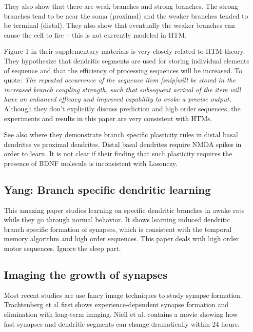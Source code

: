 \documentclass{article} %
\begin{document}
They also show that there are weak branches and strong branches.  The strong
branches tend to be near the soma (proximal) and the weaker branches tended to
be terminal (distal). They also show that eventually the weaker branches can
cause the cell to fire – this is not currently modeled in HTM.

Figure 1 in their supplementary materials is very closely related to HTM
theory. They hypothesize that dendritic segments are used for storing
individual elements of sequence and that the efficiency of processing
sequences will be increased. To quote: \emph{The repeated occurrence of the
sequence item [snip]will be stored in the increased branch coupling strength,
such that subsequent arrival of the item will have an enhanced efficacy and
improved capability to evoke a precise output.} Although they don't explicitly
discuss prediction and high order sequences, the experiments and results in this
paper are very consistent with HTMs.

See also \cite{Gordon2006} where they demonstrate branch specific plasticity
rules in distal basal dendrites vs proximal dendrites.  Distal basal dendrites
require NMDA spikes in order to learn. It is not clear if their finding that
such plasticity requires the presence of BDNF molecule is inconsistent with
Losonczy.


\subsection{Yang: Branch specific dendritic learning}

This amazing paper \cite{Yang2014} studies learning on specific dendritic
branches in awake rats while they go through normal behavior. It shows learning
induced dendritic branch specific formation of synapses, which is consistent
with the temporal memory algorithm and high order sequences. This paper deals
with high order motor sequences. Ignore the sleep part.


\subsection{Imaging the growth of synapses}

Most recent studies are use fancy image techniques to study synapse formation.
Trachtenberg et al \cite{Trachtenberg2002} first shows experience-dependent
synapse formation and elimination with long-term imaging. Niell et al.
\cite{Niell2004} contains a movie showing how fast synapses and dendritic
segments can change dramatically within 24 hours.
\end{document}
